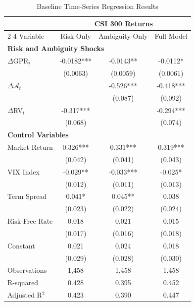 \documentclass[preprint,12pt,authoryear]{elsarticle}
\begin{document}
\begin{table}[htbp]
\centering
\caption{Baseline Time-Series Regression Results}
\label{tab:baseline_ts}
\begin{threeparttable}
\begin{tabular*}{\textwidth}{@{\extracolsep{\fill}} lccc @{\extracolsep{\fill}}}
\toprule
& \multicolumn{3}{c}{CSI 300 Returns} \\
\cmidrule(lr){2-4}
Variable & Risk-Only & Ambiguity-Only & Full Model \\
\midrule
\midrule
\multicolumn{4}{l}{\textbf{Risk and Ambiguity Shocks}} \\
$\Delta$GPR$_t$ & -0.0182*** & -0.0143** & -0.0112* \\
& (0.0063) & (0.0059) & (0.0061) \\
$\Delta \mathcal{A}_{t}$ &  & -0.526*** & -0.418*** \\
&  & (0.087) & (0.092) \\
$\Delta$RV$_t$ & -0.317*** &  & -0.294*** \\
& (0.068) &   & (0.074) \\
\midrule
\multicolumn{4}{l}{\textbf{Control Variables}} \\
Market Return & 0.326*** & 0.331*** & 0.319*** \\
& (0.042) & (0.041) & (0.043) \\
VIX Index & -0.029** & -0.033*** & -0.025* \\
& (0.012) & (0.011) & (0.013) \\
Term Spread & 0.041* & 0.045** & 0.038 \\
& (0.023) & (0.022) & (0.024) \\
Risk-Free Rate & 0.018 & 0.021 & 0.015 \\
& (0.017) & (0.016) & (0.018) \\
\midrule
Constant & 0.021 & 0.024 & 0.018 \\
& (0.029) & (0.028) & (0.030) \\
\midrule
Observations & 1,458 & 1,458 & 1,458 \\
R-squared & 0.428 & 0.395 & 0.452 \\
Adjusted R$^2$ & 0.423 & 0.390 & 0.447 \\
\bottomrule
\end{tabular*}
\begin{tablenotes}[flushleft]
\small

\end{tablenotes}
\end{threeparttable}
\end{table}
\end{document}
